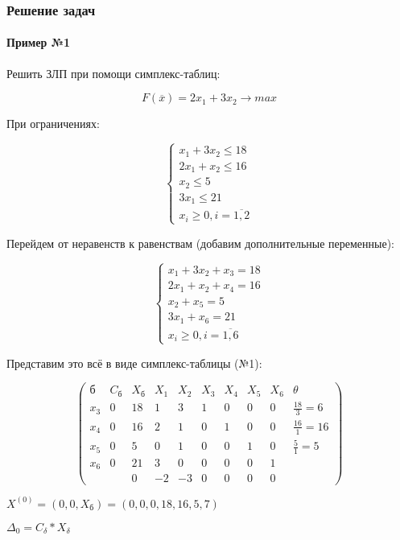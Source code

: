 \documentclass{article}
\begin{document}
\subsubsection{Решение задач}

\paragraph{Пример №1} Решить ЗЛП при помощи симплекс-таблиц:

$$F(\overline{x}) = 2x_1 + 3x_2 \to max$$

При ограничениях:

$$
\begin{cases}
    x_1 + 3x_2 \le 18 \\
    2x_1 + x_2 \le 16 \\
    x_2 \le 5 \\
    3x_1 \le 21 \\
    x_{i} \ge 0, i = \overline{1, 2}
\end{cases}
$$

Перейдем от неравенств к равенствам (добавим дополнительные переменные):

$$
\begin{cases}
    x_1 + 3x_2 + x_3 = 18 \\
    2x_1 + x_2 + x_4 = 16 \\
    x_2 + x_5 = 5 \\
    3x_1 + x_6 = 21 \\
    x_{i} \ge 0, i = \overline{1, 6}
\end{cases}
$$

Представим это всё в виде симплекс-таблицы (№1):

$$
\begin{pmatrix}
    \text{б} & C_{\text{б}} & X_{\text{б}} & X_1 & X_2 & X_3 & X_4 & X_5 & X_6 & \theta \\
    x_3 & 0 & 18 & 1 & 3 & 1 & 0 & 0 & 0 & \frac{18}{3} = 6\\
    x_4 & 0 & 16 & 2 & 1 & 0 & 1 & 0 & 0 & \frac{16}{1} = 16\\
    x_5 & 0 & 5 & 0 & 1 & 0 & 0 & 1 & 0 & \frac{5}{1} = 5\\
    x_6 & 0 & 21 & 3 & 0 & 0 & 0 & 0 & 1 \\
    & & 0 & -2 & -3 & 0 & 0 & 0 & 0
\end{pmatrix}
$$

$X^{(0)} = (0, 0, X_{\text{б}}) = (0, 0,0, 18, 16, 5, 7)$

$\Delta_{0} = C_{\delta} * X_{\delta}$
\end{document}

